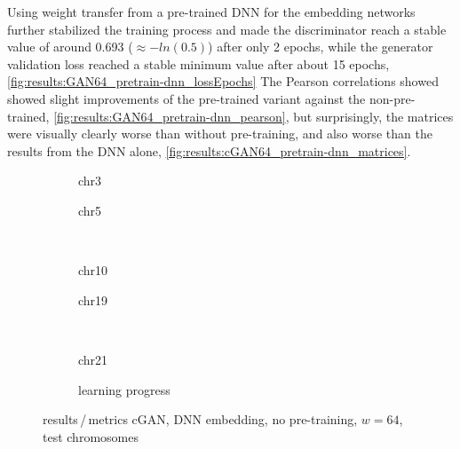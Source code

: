 Using weight transfer from a pre-trained DNN for the embedding networks further stabilized the training process 
and made the discriminator reach a stable value of around 0.693 ($\approx -ln(0.5)$)
after only 2 epochs, while the generator validation loss reached a stable minimum value after about 15 epochs, \cref{fig:results:GAN64_pretrain-dnn_lossEpochs}
The Pearson correlations showed showed slight improvements of the pre-trained variant against the non-pre-trained, \cref{fig:results:GAN64_pretrain-dnn_pearson},
but surprisingly, the matrices were visually clearly worse than without pre-training, and also worse than the results from the DNN alone, \cref{fig:results:cGAN64_pretrain-dnn_matrices}.

\begin{figure}[p] %
    \begin{subfigure}{0.45\textwidth}
        \scriptsize
        \caption{chr3}
    \end{subfigure} \hfill
    \begin{subfigure}{0.45\textwidth}
        \scriptsize
        \caption{chr5}
    \end{subfigure}\\[5mm]
    \begin{subfigure}{0.45\textwidth}
        \scriptsize
        \caption{chr10}
    \end{subfigure}\hfill
    \begin{subfigure}{0.45\textwidth}
        \scriptsize
        \caption{chr19}
    \end{subfigure}\\[3mm]
    \begin{subfigure}{0.45\textwidth}
        \scriptsize
        \caption{chr21}
    \end{subfigure} \hfill
    \begin{subfigure}{0.45\textwidth}
        \scriptsize
        \caption{learning progress} \label{fig:results:GAN64-dnn_lossEpochs}
    \end{subfigure}
    \caption{results\,/\,metrics cGAN, DNN embedding, no pre-training, $w=64$, test chromosomes}   \label{fig:results:GAN64-dnn_pearson}
\end{figure}
